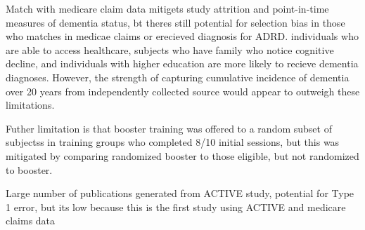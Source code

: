 \documentclass[11pt]{article}
\begin{document}
Match with medicare claim data mitigets study attrition and point-in-time measures of dementia status, bt theres still potential for selection bias in those who matches in medicae claims or erecieved diagnosis for ADRD. individuals who are able to access healthcare, subjects who have family who notice cognitive decline, and individuals with higher education are more likely to recieve dementia diagnoses. However, the strength of capturing cumulative incidence of dementia over 20 years from independently collected source would appear to outweigh these limitations.

Futher limitation is that booster training was offered to a random subset of subjectss in training groups who completed 8/10 initial sessions, but this was mitigated by comparing randomized booster to those eligible, but not randomized to booster.

Large number of publications generated from ACTIVE study, potential for Type 1 error, but its low because this is the first study using ACTIVE and medicare claims data
\end{document}
